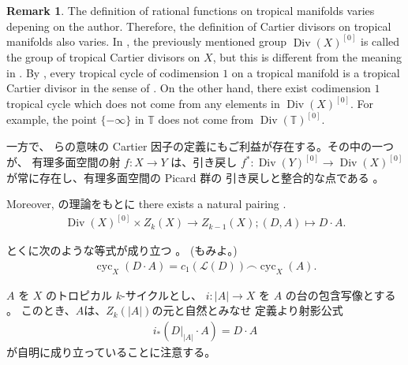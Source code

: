 \documentclass[a4paper,dvipdfmx,reqno,12pt]{amsart}
\theoremstyle{definition}
\newtheorem{remark}[theorem]{Remark}
\newcommand{\opn}[1]{\operatorname{#1}}
\numberwithin{equation}{section}
\begin{document}
\begin{remark}
The definition of rational functions on tropical
manifolds varies depening on the author.
Therefore, the definition of Cartier divisors
on tropical manifolds also varies.
In \cite{MR3894860,MR4637248},
the previously mentioned group
$\opn{Div}(X)^{[0]}$ is called
the group of tropical Cartier divisors on $X$,
but this is different from the meaning
in \cite{demedrano2023chern}.
By \cite[Proposition 3.27]{shaw2015tropical},
every tropical cycle of codimension $1$ on a tropical manifold
is a tropical Cartier divisor in the sense of
\cite{shaw2015tropical,demedrano2023chern}.
On the other hand, there exist codimension $1$
tropical cycle which does not come from any
elements in $\opn{Div}(X)^{[0]}$.
For example,
the point $\{-\infty\}$ in $\mathbb{T}$ does not
come from $\opn{Div}(\mathbb{T})^{[0]}$.

一方で、\cite{MR3894860,MR4637248} らの意味の Cartier 
因子の定義にもご利益が存在する。その中の一つが、
有理多面空間の射 $f\colon X\to Y$ は、引き戻し
$f^{*}\colon \opn{Div}(Y)^{[0]} \to \opn{Div}(X)^{[0]}$
が常に存在し、有理多面空間の Picard 群の
引き戻しと整合的な点である
\cite[Propoisition 3.15]{MR4637248}。
\end{remark}

Moreover, \cite{MR2591823} の理論をもとに
there exists a natural pairing
\cite[]{MR4637248}.
\begin{align}
\label{equation-divisor-pairing}
\opn{Div}(X)^{[0]}\times Z_{k}(X)\to Z_{k-1}(X);
(D,A) \mapsto D\cdot A.
\end{align}

とくに次のような等式が成り立つ
\cite[Proposition 5.12]{MR4637248}。
(\cite[Theorem 4.15]{MR3894860}もみよ。)
\begin{align}
\opn{cyc}_X(D\cdot A)=c_1(\mathcal{L}(D))
\frown \opn{cyc}_X(A).
\end{align}

$A$ を $X$ のトロピカル $k$-サイクルとし、
$i\colon |A|\to X$ を $A$ の台の包含写像とする
\cite[Definition 3.5]{MR4637248}。
このとき、$A$は、$Z_k(|A|)$の元と自然とみなせ
定義より射影公式
\begin{align}
\label{equation-projection-formula}
i_*(D|_{|A|}\cdot A)=D\cdot A
\end{align}
が自明に成り立っていることに注意する。
\end{document}
